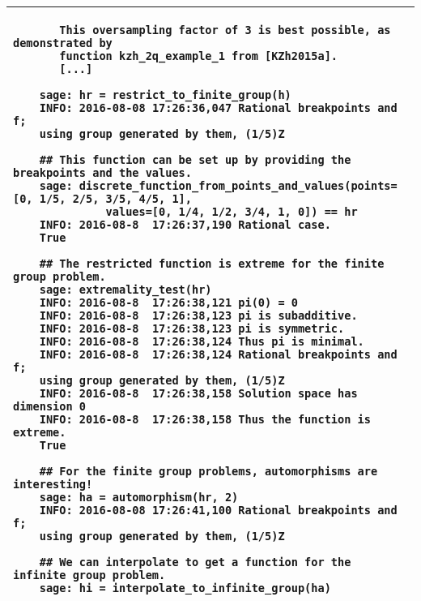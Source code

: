 \documentclass[suppldata]{gOMS2e}   %
\begin{document}
\begin{table}
\begin{tabular}{@{}p{\linewidth}@{}}
\begin{verbatim}
	   This oversampling factor of 3 is best possible, as demonstrated by
	   function kzh_2q_example_1 from [KZh2015a].
	   [...]

	sage: hr = restrict_to_finite_group(h)
	INFO: 2016-08-08 17:26:36,047 Rational breakpoints and f; 
	using group generated by them, (1/5)Z
	
	## This function can be set up by providing the breakpoints and the values.
	sage: discrete_function_from_points_and_values(points=[0, 1/5, 2/5, 3/5, 4/5, 1], 
	          values=[0, 1/4, 1/2, 3/4, 1, 0]) == hr
	INFO: 2016-08-8  17:26:37,190 Rational case.
	True

	## The restricted function is extreme for the finite group problem.
	sage: extremality_test(hr)
	INFO: 2016-08-8  17:26:38,121 pi(0) = 0
	INFO: 2016-08-8  17:26:38,123 pi is subadditive.
	INFO: 2016-08-8  17:26:38,123 pi is symmetric.
	INFO: 2016-08-8  17:26:38,124 Thus pi is minimal.
	INFO: 2016-08-8  17:26:38,124 Rational breakpoints and f; 
	using group generated by them, (1/5)Z
	INFO: 2016-08-8  17:26:38,158 Solution space has dimension 0
	INFO: 2016-08-8  17:26:38,158 Thus the function is extreme.
	True
	
	## For the finite group problems, automorphisms are interesting!
	sage: ha = automorphism(hr, 2)
	INFO: 2016-08-08 17:26:41,100 Rational breakpoints and f; 
	using group generated by them, (1/5)Z
	
	## We can interpolate to get a function for the infinite group problem.
	sage: hi = interpolate_to_infinite_group(ha)
	\end{verbatim}
    \\
    \bottomrule
  \end{tabular}
\end{table}
\end{document}
